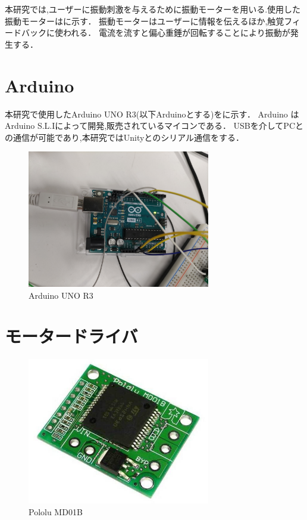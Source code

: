 本研究では,ユーザーに振動刺激を与えるために振動モーターを用いる.使用した振動モーターはに示す．
振動モーターはユーザーに情報を伝えるほか,触覚フィードバックに使われる．
電流を流すと偏心重錘が回転することにより振動が発生する．


\section{Arduino}
本研究で使用したArduino UNO R3\cite{arduino}(以下Arduinoとする)をに示す．
Arduino はArduino S.L.Iによって開発,販売されているマイコンである．
USBを介してPCとの通信が可能であり,本研究ではUnityとのシリアル通信をする．

\begin{figure}[h]
\centering
\includegraphics[clip,width=8cm]{./fig/Arduino.png}
\caption{Arduino UNO R3}\label{arduino}
\end{figure}

\newpage

\section{モータードライバ}

\begin{figure}[h]
\centering
\includegraphics[clip,width=8cm]{./fig/pololuMD01B.png}
\caption{Pololu MD01B}\label{polo}
\end{figure}

